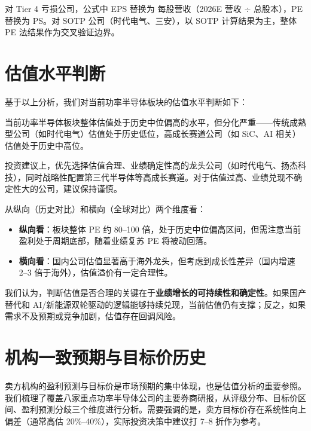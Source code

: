 对 Tier 4 亏损公司，公式中 EPS 替换为 每股营收（2026E 营收 $\div$ 总股本），PE 替换为 PS。对 SOTP 公司（时代电气、三安），以 SOTP 计算结果为主，整体 PE 法结果作为交叉验证边界。

\vspace{0.3em}

\section{估值水平判断}

基于以上分析，我们对当前功率半导体板块的估值水平判断如下：

\begin{keyinsight}[估值水平整体判断]
当前功率半导体板块整体估值处于历史中位偏高的水平，但分化严重——传统成熟型公司（如时代电气）估值处于历史低位，高成长赛道公司（如 SiC、AI 相关）估值处于历史中高位。

投资建议上，优先选择估值合理、业绩确定性高的龙头公司（如时代电气、扬杰科技），同时战略性配置第三代半导体等高成长赛道。对于估值过高、业绩兑现不确定性大的公司，建议保持谨慎。
\end{keyinsight}

从纵向（历史对比）和横向（全球对比）两个维度看：

\begin{itemize}[leftmargin=2em]
\item \textbf{纵向看}：板块整体 PE 约 80–100 倍，处于历史中位偏高区间，但需注意当前盈利处于周期底部，随着业绩复苏 PE 将被动回落。
\item \textbf{横向看}：国内公司估值显著高于海外龙头，但考虑到成长性差异（国内增速 2–3 倍于海外），估值溢价有一定合理性。
\end{itemize}

我们认为，判断估值是否合理的关键在于\textbf{业绩增长的可持续性和确定性}。如果国产替代和 AI/新能源双轮驱动的逻辑能够持续兑现，当前估值仍有支撑；反之，如果需求不及预期或竞争加剧，估值存在回调风险。

\section{机构一致预期与目标价历史}

卖方机构的盈利预测与目标价是市场预期的集中体现，也是估值分析的重要参照。我们梳理了覆盖八家重点功率半导体公司的主要券商研报，从评级分布、目标价区间、盈利预测分歧三个维度进行分析。需要强调的是，卖方目标价存在系统性向上偏差（通常高估 20\%–40\%），实际投资决策中建议打 7–8 折作为参考。

